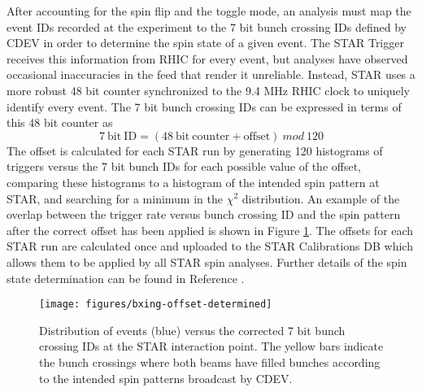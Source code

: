 After accounting for the spin flip and the toggle mode, an analysis must map
the event IDs recorded at the experiment to the 7 bit bunch crossing IDs
defined by CDEV in order to determine the spin state of a given event. The
STAR Trigger receives this information from RHIC for every event, but analyses
have observed occasional inaccuracies in the feed that render it unreliable.
Instead, STAR uses a more robust 48 bit counter synchronized to the 9.4 MHz
RHIC clock to uniquely identify every event. The 7 bit bunch crossing IDs can
be expressed in terms of this 48 bit counter as
%
\begin{equation}
  \mathrm{7~bit~ID} = \left(\mathrm{48~bit~counter} + \mathrm{offset}\right)~mod~120
\end{equation}
%
The offset is calculated for each STAR run by generating 120 histograms of
triggers versus the 7 bit bunch IDs for each possible value of the offset,
comparing these histograms to a histogram of the intended spin pattern at
STAR, and searching for a minimum in the $\chi^2$ distribution. An example of
the overlap between the trigger rate versus bunch crossing ID and the spin
pattern after the correct offset has been applied is shown in Figure
\ref{fig:bxing-offset}. The offsets for each STAR run are calculated once and
uploaded to the STAR Calibrations DB which allows them to be applied by all
STAR spin analyses. Further details of the spin state determination can be
found in Reference \cite{spin-db-website}.

\begin{figure}
  \texttt{[image: figures/bxing-offset-determined]}
  \caption{Distribution of events (blue) versus the corrected 7 bit bunch
  crossing IDs at the STAR interaction point. The yellow bars indicate the
  bunch crossings where both beams have filled bunches according to the
  intended spin patterns broadcast by CDEV.}
  \label{fig:bxing-offset}
\end{figure}
